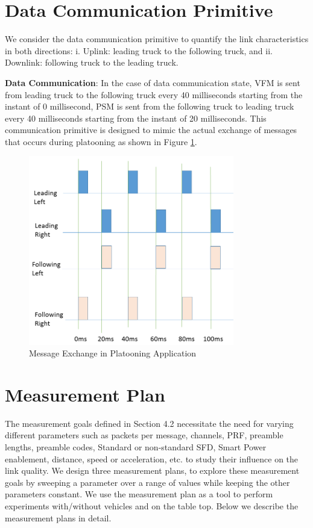 \section{Data Communication Primitive}
We consider the data communication primitive to quantify the link characteristics in both directions: i. Uplink: leading truck to the following truck, and ii. Downlink: following truck to the leading truck.

    \textbf{Data Communication}: In the case of data communication state, VFM is sent from leading truck to the following truck every 40 milliseconds starting from the instant of 0 millisecond, PSM is sent from the following truck to leading truck every 40 milliseconds starting from the instant of 20 milliseconds. This communication primitive is designed to mimic the actual exchange of messages that occurs during platooning as shown in Figure \ref{fig:MessageExchangePlatooningApplication}.
    
    \begin{figure}[htbp]
        \begin{center}
            \includegraphics[width=0.8\textwidth]{figures/Picture6.png}
            \caption{Message Exchange in Platooning Application}
            \label{fig:MessageExchangePlatooningApplication}
        \end{center}
    \end{figure}

\section{Measurement Plan}
The measurement goals defined in Section 4.2 necessitate the need for varying different parameters such as packets per message, channels, PRF, preamble lengths, preamble codes, Standard or non-standard SFD, Smart Power enablement, distance, speed or acceleration, etc. to study their influence on the link quality. We design three measurement plans, to explore these measurement goals by sweeping a parameter over a range of values while keeping the other parameters constant. We use the measurement plan as a tool to perform experiments with/without vehicles and on the table top. Below we describe the measurement plans in detail.

